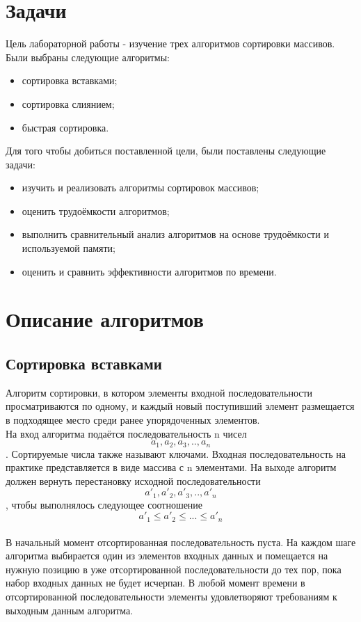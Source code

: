\documentclass[12pt, a4paper]{report}
\begin{document}
	\section{Задачи}
	Цель лабораторной работы - изучение трех алгоритмов сортировки массивов. Были выбраны следующие алгоритмы:
	\begin{itemize}
		\item сортировка вставками;
		\item сортировка слиянием;
		\item быстрая сортировка.
	\end{itemize}
	Для того чтобы добиться поставленной цели, были поставлены следующие задачи:
	\begin{itemize}
		\item изучить и реализовать алгоритмы сортировок массивов;
		\item оценить трудоёмкости алгоритмов;
		\item выполнить сравнительный анализ алгоритмов на основе трудоёмкости и используемой памяти;
		\item оценить и сравнить эффективности алгоритмов по времени.
	\end{itemize}

	\section{Описание алгоритмов}
	
	\subsection{Сортировка вставками}
	Алгоритм сортировки, в котором элементы входной последовательности просматриваются по одному, и каждый новый поступивший элемент размещается в подходящее место среди ранее упорядоченных элементов.\\
	На вход алгоритма подаётся последовательность n чисел $$a_1, a_2, a_3,.., a_n$$. Сортируемые числа также называют ключами. Входная последовательность на практике представляется в виде массива с n	элементами. На выходе алгоритм должен вернуть перестановку исходной последовательности $$a'_1, a'_2, a'_3,.., a'_n$$,  чтобы выполнялось следующее соотношение 
	$$a'_1 \leq a'_2 \leq ...\leq a'_n$$\\
	В начальный момент отсортированная последовательность пуста. На каждом шаге алгоритма выбирается один из элементов входных данных и помещается на нужную позицию в уже отсортированной последовательности до тех пор, пока набор входных данных не будет исчерпан. В любой момент времени в отсортированной последовательности элементы удовлетворяют требованиям к выходным данным алгоритма.
\end{document}

